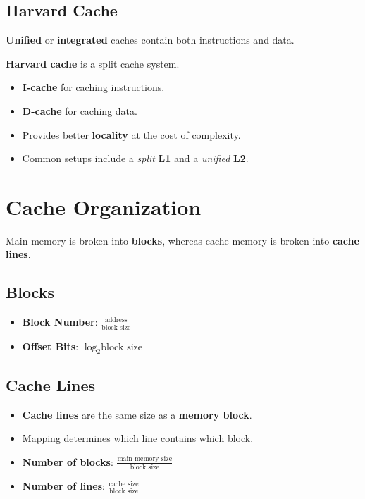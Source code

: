 \documentclass[12pt, letterpaper]{article}
\begin{document}
\subsection*{Harvard Cache}

\textbf{Unified} or \textbf{integrated} caches contain both
instructions and data.
\bigskip

\textbf{Harvard cache} is a split cache system.

\begin{itemize}
  \item \textbf{I-cache} for caching instructions.
  \item \textbf{D-cache} for caching data.
  \item Provides better \textbf{locality} at the cost of complexity.
  \item Common setups include a \textit{split} \textbf{L1} and a
    \textit{unified} \textbf{L2}.
\end{itemize}

\section*{Cache Organization}

Main memory is broken into \textbf{blocks}, whereas cache memory is
broken into \textbf{cache lines}.

\subsection*{Blocks}

\begin{itemize}
  \item \textbf{Block Number}: $\displaystyle
    \frac{\textrm{address}}{\textrm{block size}} $
  \item \textbf{Offset Bits}: $ \log_2 \textrm{block size} $
\end{itemize}

\subsection*{Cache Lines}

\begin{itemize}
  \item \textbf{Cache lines} are the same size as a \textbf{memory block}.
  \item Mapping determines which line contains which block.
  \item \textbf{Number of blocks}: $\displaystyle \frac{\textrm{main
    memory size}}{\textrm{block size}} $
  \item \textbf{Number of lines}: $\displaystyle \frac{\textrm{cache
    size}}{\textrm{block size}} $
\end{itemize}
\end{document}
